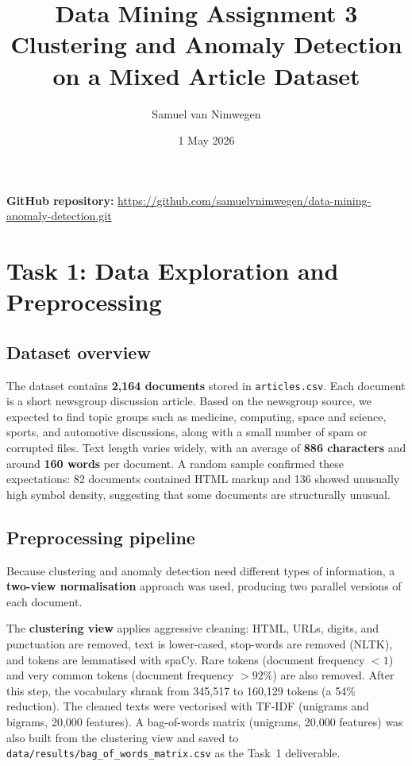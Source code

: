 \documentclass[11pt,a4paper]{article}
\title{\textbf{Data Mining Assignment 3}\\[0.3em]
       \large Clustering and Anomaly Detection on a Mixed Article Dataset}
\author{Samuel van Nimwegen}
\date{1 May 2026}
\begin{document}
\maketitle

\noindent\textbf{GitHub repository:}
\url{https://github.com/samuelvnimwegen/data-mining-anomaly-detection.git}

\bigskip

\section{Task 1: Data Exploration and Preprocessing}

\subsection{Dataset overview}

The dataset contains \textbf{2,164 documents} stored in \texttt{articles.csv}. Each document is a short newsgroup discussion article. Based on the newsgroup source, we expected to find topic groups such as medicine, computing, space and science, sports, and automotive discussions, along with a small number of spam or corrupted files. Text length varies widely, with an average of \textbf{886 characters} and around \textbf{160 words} per document. A random sample confirmed these expectations: 82 documents contained HTML markup and 136 showed unusually high symbol density, suggesting that some documents are structurally unusual.

\subsection{Preprocessing pipeline}

Because clustering and anomaly detection need different types of information, a \textbf{two-view normalisation} approach was used, producing two parallel versions of each document.

The \textbf{clustering view} applies aggressive cleaning: HTML, URLs, digits, and punctuation are removed, text is lower-cased, stop-words are removed (NLTK), and tokens are lemmatised with spaCy. Rare tokens (document frequency $< 1$) and very common tokens (document frequency $> 92\%$) are also removed. After this step, the vocabulary shrank from 345,517 to 160,129 tokens (a 54\% reduction). The cleaned texts were vectorised with TF-IDF (unigrams and bigrams, 20,000 features). A bag-of-words matrix (unigrams, 20,000 features) was also built from the clustering view and saved to \texttt{data/results/bag\_of\_words\_matrix.csv} as the Task~1 deliverable.
\end{document}
